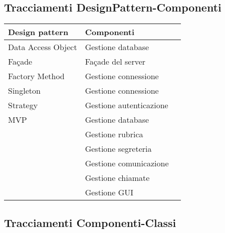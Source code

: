 \subsection{Tracciamenti DesignPattern-Componenti}\label{sec:tracDpComp}

\begin{center}
\begin{longtable}{lp{}l}
\toprule Design pattern & Componenti\\
\midrule
Data Access Object & Gestione database\\
Façade & Façade del server\\
Factory Method & Gestione connessione\\
Singleton & Gestione connessione\\
Strategy & Gestione autenticazione\\
MVP & Gestione database\\
& Gestione rubrica\\
& Gestione segreteria\\
& Gestione comunicazione\\
& Gestione chiamate\\
& Gestione GUI\\
\bottomrule
\end{longtable}
\end{center}
\subsection{Tracciamenti Componenti-Classi}\label{sec:tracCompClass}


